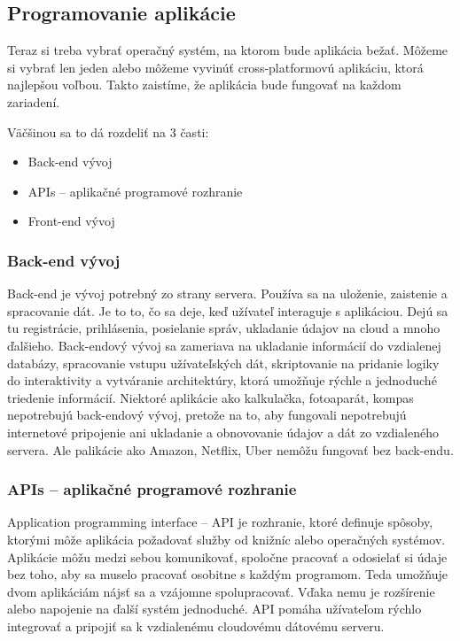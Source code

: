 \documentclass[10pt,twoside,slovak,a4paper]{article}
\begin{document}
\subsection{Programovanie aplikácie}
\quad Teraz si treba vybrať operačný systém, na ktorom bude aplikácia bežať. Môžeme si vybrať len jeden alebo môžeme vyvinúť cross-platformovú aplikáciu, ktorá najlepšou voľbou. Takto zaistíme, že aplikácia bude fungovať na každom zariadení.

Väčšinou sa to dá rozdeliť na 3 časti:
\begin{itemize}
\item Back-end vývoj
\item APIs – aplikačné programové rozhranie
\item Front-end vývoj
\end{itemize}


\subsubsection{Back-end vývoj}
\quad Back-end je vývoj potrebný zo strany servera. Používa sa na uloženie, zaistenie a spracovanie dát. Je to to, čo sa deje, keď užívateľ interaguje s aplikáciou. Dejú sa tu registrácie, prihlásenia, posielanie správ, ukladanie údajov na cloud a mnoho ďalšieho. Back-endový vývoj sa zameriava na ukladanie informácií do vzdialenej databázy, spracovanie vstupu užívateľských dát, skriptovanie na pridanie logiky do interaktivity a vytváranie architektúry, ktorá umožňuje rýchle a jednoduché triedenie informácií. Niektoré aplikácie ako kalkulačka, fotoaparát, kompas nepotrebujú back-endový vývoj, pretože na to, aby fungovali nepotrebujú internetové pripojenie ani ukladanie a obnovovanie údajov a dát zo vzdialeného servera. Ale palikácie ako Amazon, Netflix, Uber nemôžu fungovať bez back-endu.


\subsubsection{APIs – aplikačné programové rozhranie}
\quad Application programming interface – API je rozhranie, ktoré definuje spôsoby, ktorými môže aplikácia požadovať služby od knižníc alebo operačných systémov. Aplikácie môžu medzi sebou komunikovať, spoločne pracovať a odosielať si údaje bez toho, aby sa muselo pracovať osobitne s každým programom. Teda umožňuje dvom aplikáciám nájsť sa a vzájomne spolupracovať. Vďaka nemu je rozšírenie alebo napojenie na ďalší systém jednoduché. API pomáha užívateľom rýchlo integrovať a pripojiť sa k vzdialenému cloudovému dátovému serveru. 
\end{document}
